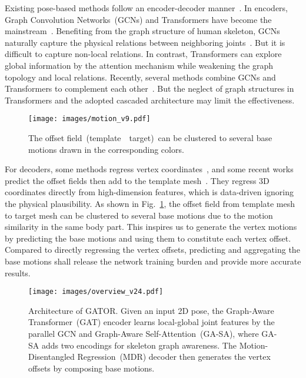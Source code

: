 \documentclass{article}
\begin{document}
Existing pose-based methods follow an encoder-decoder manner~\cite{survey}. In encoders, Graph Convolution Networks~(GCNs) and Transformers have become the mainstream~\cite{zeng2021learning,li2022exploiting,mhformer}. 
Benefiting from the graph structure of human skeleton, GCNs naturally capture the physical relations between neighboring joints~\cite{zou2021modulated,li2022graphmlp}. 
But it is difficult to capture non-local relations.
In contrast, Transformers can
explore global information by the attention mechanism while weakening the graph topology and local relations. 
Recently, several methods combine GCNs and Transformers to complement each other~\cite{zheng2021lightweight, lin2021mesh}.
But the neglect of graph structures in Transformers and the adopted cascaded architecture may limit the effectiveness.


\begin{figure}
  \centering
  \texttt{[image: images/motion\_v9.pdf]}
  \vspace{-4mm}
  \caption{The offset field~(template~~target)~can be clustered to several base motions drawn in the corresponding colors.
}
  \label{fig_motions}
  \vspace{-4.5mm}
\end{figure}

For decoders, 
some methods regress vertex coordinates~\cite{lin2021mesh, kolotouros2019convolutional,lin2021end}, and some recent works predict the offset fields then add to the template mesh~\cite{zheng2021lightweight, luan2021pc, zanfir2021thundr}. 
They regress 3D coordinates directly from high-dimension features, which is data-driven ignoring the physical plausibility. 
As shown in Fig.~\ref{fig_motions}, the offset field from template mesh to target mesh can be clustered to several base motions due to the motion similarity in the same body part.
This inspires us to generate the vertex motions by predicting the base motions and using them to constitute each vertex offset.
Compared to directly regressing the vertex offsets, predicting and aggregating the base motions shall release the network training burden and provide more accurate results.

\begin{figure*}[htb]
    \centering    
\texttt{[image: images/overview\_v24.pdf]}
\vspace{-3mm}
    \caption{
Architecture of GATOR.
        Given an input 2D pose,
        the Graph-Aware Transformer~(GAT) encoder learns local-global joint features by the parallel GCN and Graph-Aware Self-Attention~(GA-SA), where GA-SA adds two encodings for skeleton graph awareness. The Motion-Disentangled Regression~(MDR) decoder then generates the vertex offsets by composing base motions.
    }
    \label{fig:overview}
\vspace{-4mm}
\end{figure*}
\end{document}
